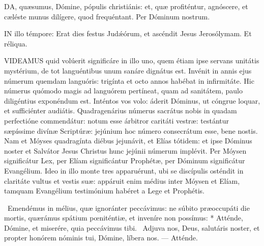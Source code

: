 
\lettrine[lines=2]{D}{A}, quæsumus, Dómine, pópulis christiánis: et, quæ profiténtur, agnóscere, et cæléste munus dilígere, quod frequéntant. Per Dóminum nostrum.

\sectionornament




\lettrine[lines=2]{I}{N} illo témpore: Erat dies festus Judǽórum, et ascéndit Jesus Jerosólymam. Et réliqua.



\lettrine[lines=2]{V}{IDEAMUS} quid volúerit significáre in illo uno, quem étiam ipse servans unitátis mystérium, de tot languéntibus unum sanáre dignátus est. Invénit in annis ejus númerum quemdam languóris: trigínta et octo annos habébat in infirmitáte. Hic númerus quómodo magis ad languórem pertíneat, quam ad sanitátem, paulo diligéntius exponéndum est. Inténtos vos volo: áderit Dóminus, ut cóngrue loquar, et sufficiénter audiátis. Quadragenárius númerus sacrátus nobis in quadam perfectióne commendátur: notum esse árbitror caritáti vestræ: testántur sæpíssime divínæ Scriptúræ: jejúnium hoc número consecrátum esse, bene nostis. Nam et Móyses quadragínta diébus jejunávit, et Elías tótidem: et ipse Dóminus noster et Salvátor Jesus Christus hunc jejúnii númerum implévit. Per Móysen significátur Lex, per Elíam significántur Prophétæ, per Dóminum significátur Evangélium. Ideo in illo monte tres apparuérunt, ubi se discípulis osténdit in claritáte vultus et vestis suæ: appáruit enim médius inter Móysen et Elíam, tamquam Evangélium testimónium habéret a Lege et Prophétis.

\R\ Emendémus in mélius, quæ ignoránter peccávimus: ne súbito præoccupáti die mortis, quærámus spátium pœniténtiæ, et inveníre non possímus: * Atténde, Dómine, et miserére, quia peccávimus tibi. \V\ Adjuva nos, Deus, salutáris noster, et propter honórem nóminis tui, Dómine, líbera nos. --- Atténde.



